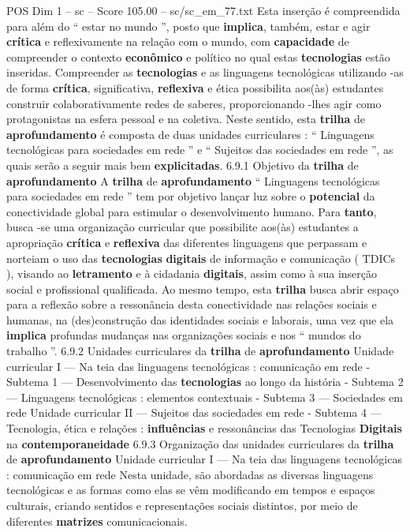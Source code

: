 \begin{textsample}{POS Dim 1 – sc – Score 105.00 – sc/sc\_em\_77.txt}
Esta inserção é compreendida para além do “ estar no mundo ”, posto que \textbf{implica}, também, estar e agir \textbf{crítica} e reflexivamente na relação com o mundo, com \textbf{capacidade} de compreender o contexto \textbf{econômico} e político no qual estas \textbf{tecnologias} estão inseridas.
Compreender as \textbf{tecnologias} e as linguagens tecnológicas utilizando -as de forma \textbf{crítica}, significativa, \textbf{reflexiva} e ética possibilita aos(às) estudantes construir colaborativamente redes de saberes, proporcionando -lhes agir como protagonistas na esfera pessoal e na coletiva.
Neste sentido, esta \textbf{trilha} de \textbf{aprofundamento} é composta de duas unidades curriculares : “ Linguagens tecnológicas para sociedades em rede ” e “ Sujeitos das sociedades em rede ”, as quais serão a seguir mais bem \textbf{explicitadas}. 6.9.1 Objetivo da \textbf{trilha} de \textbf{aprofundamento} A \textbf{trilha} de \textbf{aprofundamento} “ Linguagens tecnológicas para sociedades em rede ” tem por objetivo lançar luz sobre o \textbf{potencial} da conectividade global para estimular o desenvolvimento humano.
Para \textbf{tanto}, busca -se uma organização curricular que possibilite aos(às) estudantes a apropriação \textbf{crítica} e \textbf{reflexiva} das diferentes linguagens que perpassam e norteiam o uso das \textbf{tecnologias} \textbf{digitais} de informação e comunicação ( TDICs ), visando ao \textbf{letramento} e à cidadania \textbf{digitais}, assim como à sua inserção social e profissional qualificada.
Ao mesmo tempo, esta \textbf{trilha} busca abrir espaço para a reflexão sobre a ressonância desta conectividade nas relações sociais e humanas, na (des)construção das identidades sociais e laborais, uma vez que ela \textbf{implica} profundas mudanças nas organizações sociais e nos “ mundos do trabalho ”. 6.9.2 Unidades curriculares da \textbf{trilha} de \textbf{aprofundamento} Unidade curricular I — Na teia das linguagens tecnológicas : comunicação em rede - Subtema 1 — Desenvolvimento das \textbf{tecnologias} ao longo da história - Subtema 2 — Linguagens tecnológicas : elementos contextuais - Subtema 3 — Sociedades em rede Unidade curricular II — Sujeitos das sociedades em rede - Subtema 4 — Tecnologia, ética e relações : \textbf{influências} e ressonâncias das Tecnologias \textbf{Digitais} na \textbf{contemporaneidade} 6.9.3 Organização das unidades curriculares da \textbf{trilha} de \textbf{aprofundamento} Unidade curricular I — Na teia das linguagens tecnológicas : comunicação em rede Nesta unidade, são abordadas as diversas linguagens tecnológicas e as formas como elas se vêm modificando em tempos e espaços culturais, criando sentidos e representações sociais distintos, por meio de diferentes \textbf{matrizes} comunicacionais.

\end{textsample}
